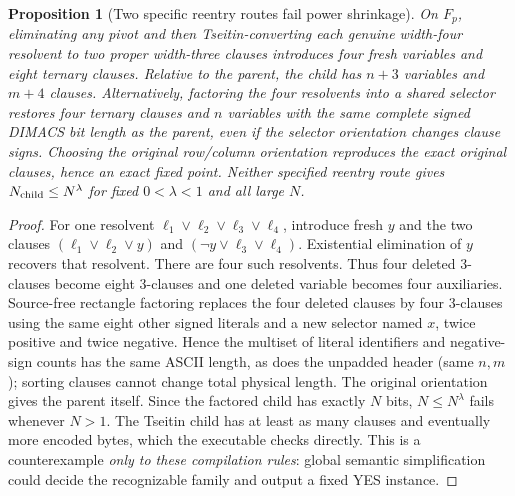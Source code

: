 \documentclass[11pt]{article}
\newtheorem{proposition}[theorem]{Proposition}
\begin{document}
\begin{proposition}[Two specific reentry routes fail power shrinkage]
On $F_p$, eliminating any pivot and then Tseitin-converting each genuine width-four resolvent to two proper width-three clauses introduces four fresh variables and eight ternary clauses. Relative to the parent, the child has $n+3$ variables and $m+4$ clauses. Alternatively, factoring the four resolvents into a shared selector restores four ternary clauses and $n$ variables with the \emph{same complete signed DIMACS bit length} as the parent, even if the selector orientation changes clause signs. Choosing the original row/column orientation reproduces the exact original clauses, hence an exact fixed point. Neither specified reentry route gives $N_{\rm child}\le N^\lambda$ for fixed $0<\lambda<1$ and all large $N$.
\end{proposition}
\begin{proof}
For one resolvent $\ell_1\vee\ell_2\vee\ell_3\vee\ell_4$, introduce fresh $y$ and the two clauses $(\ell_1\vee\ell_2\vee y)$ and $(\neg y\vee\ell_3\vee\ell_4)$. Existential elimination of $y$ recovers that resolvent. There are four such resolvents. Thus four deleted 3-clauses become eight 3-clauses and one deleted variable becomes four auxiliaries. Source-free rectangle factoring replaces the four deleted clauses by four 3-clauses using the same eight other signed literals and a new selector named $x$, twice positive and twice negative. Hence the multiset of literal identifiers and negative-sign counts has the same ASCII length, as does the unpadded header (same $n,m$); sorting clauses cannot change total physical length. The original orientation gives the parent itself. Since the factored child has exactly $N$ bits, $N\le N^\lambda$ fails whenever $N>1$. The Tseitin child has at least as many clauses and eventually more encoded bytes, which the executable checks directly. This is a counterexample \emph{only to these compilation rules}: global semantic simplification could decide the recognizable family and output a fixed YES instance.
\end{proof}
\end{document}
